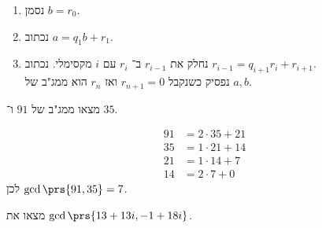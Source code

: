 \documentclass[a4paper,10pt,twoside,openany]{book}
\begin{document}
\begin{algorithm}
\begin{enumerate}
\item נסמן
$b = r_0$.
\item נכתוב
$a = q_1 b + r_1$.
\item נחלק את
$r_{i-1}$
ב־%
$r_{i}$
עם
$i$
מקסימלי.
נכתוב
$r_{i-1} = q_{i+1}r_i + r_{i+1}$.
\\ נפסיק כשנקבל
$r_{n+1} = 0$
ואז
$r_n$
הוא ממג"ב של
$a,b$.
\end{enumerate}
\end{algorithm}
\begin{exercise}
מצאו ממג"ב של
$91$
ו־%
$35$.
\end{exercise}
\begin{solution}
\begin{align*}
91 &= 2\cdot 35 + 21 \\
35 &= 1 \cdot 21 + 14 \\
21 &= 1\cdot 14 + 7 \\
14 &= 2\cdot 7 + 0
\end{align*}
לכן
$\gcd\prs{91,35} = 7$.
\end{solution}
\begin{exercise}
מצאו את
$\gcd\prs{13 + 13i, -1+18i}$.
\end{exercise}
\end{document}
